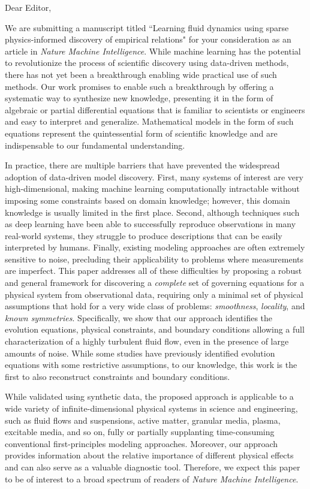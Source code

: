 \documentclass[11pt]{letter} %
\begin{document}
\begin{letter}

Dear Editor,

We are submitting a manuscript titled ``Learning fluid dynamics using sparse physics-informed discovery of empirical relations" for your consideration as an article in {\em Nature Machine Intelligence}.  
While machine learning has the potential to revolutionize the process of scientific discovery using data-driven methods, there has not yet been a breakthrough enabling wide practical use of such methods.
Our work promises to enable such a breakthrough by offering a systematic way to synthesize new knowledge, presenting it in the form of algebraic or partial differential equations that is familiar to scientists or engineers and easy to interpret and generalize.
Mathematical models in the form of such equations represent the quintessential form of scientific knowledge and are indispensable to our fundamental understanding.

In practice, there are multiple barriers that have prevented the widespread adoption of data-driven model discovery. First, many systems of interest are very high-dimensional, making machine learning computationally intractable without imposing some constraints based on domain knowledge; however, this domain knowledge is usually limited in the first place. Second, although techniques such as deep learning have been able to successfully reproduce observations in many real-world systems, they struggle to produce descriptions that can be easily interpreted by humans. Finally, existing modeling approaches are often extremely sensitive to noise, precluding their applicability to problems where measurements are imperfect. This paper addresses all of these difficulties by proposing a robust and general framework for discovering a {\it complete} set of governing equations for a physical system from observational data, requiring only a minimal set of physical assumptions that hold for a very wide class of problems: {\it smoothness}, {\it locality}, and {\it known symmetries}. Specifically, we show that our approach identifies the evolution equations, physical constraints, and boundary conditions allowing a full characterization of a highly turbulent fluid flow, even in the presence of large amounts of noise. While some studies have previously identified evolution equations with some restrictive assumptions, to our knowledge, this work is the first to also reconstruct constraints and boundary conditions. 

While validated using synthetic data, the proposed approach is applicable to a wide variety of infinite-dimensional physical systems in science and engineering, such as fluid flows and suspensions, active matter, granular media, plasma, excitable media, and so on, fully or partially supplanting time-consuming conventional first-principles modeling approaches. Moreover, our approach provides information about the relative importance of different physical effects and can also serve as a valuable diagnostic tool. Therefore, we expect this paper to be of interest to a broad spectrum of readers of {\it Nature Machine Intelligence}.


\end{letter}
\end{document}
